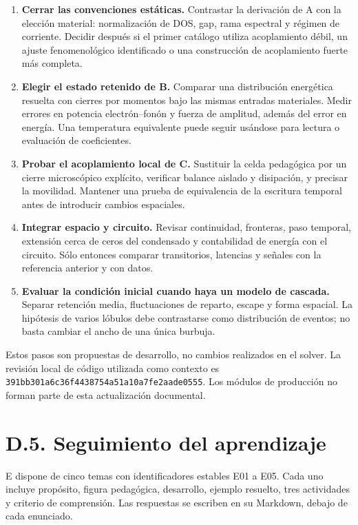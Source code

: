 \documentclass[
  spanish,
  10pt,
  a4paper,
]{article}
\providecommand{\tightlist}{%
  \setlength{\itemsep}{0pt}\setlength{\parskip}{0pt}}
\begin{document}
\begin{enumerate}
\def\labelenumi{\arabic{enumi}.}
\tightlist
\item
  \textbf{Cerrar las convenciones estáticas.} Contrastar la derivación
  de A con la elección material: normalización de DOS, gap, rama
  espectral y régimen de corriente. Decidir después si el primer
  catálogo utiliza acoplamiento débil, un ajuste fenomenológico
  identificado o una construcción de acoplamiento fuerte más completa.
\item
  \textbf{Elegir el estado retenido de B.} Comparar una distribución
  energética resuelta con cierres por momentos bajo las mismas entradas
  materiales. Medir errores en potencia electrón--fonón y fuerza de
  amplitud, además del error en energía. Una temperatura equivalente
  puede seguir usándose para lectura o evaluación de coeficientes.
\item
  \textbf{Probar el acoplamiento local de C.} Sustituir la celda
  pedagógica por un cierre microscópico explícito, verificar balance
  aislado y disipación, y precisar la movilidad. Mantener una prueba de
  equivalencia de la escritura temporal antes de introducir cambios
  espaciales.
\item
  \textbf{Integrar espacio y circuito.} Revisar continuidad, fronteras,
  paso temporal, extensión cerca de ceros del condensado y contabilidad
  de energía con el circuito. Sólo entonces comparar transitorios,
  latencias y señales con la referencia anterior y con datos.
\item
  \textbf{Evaluar la condición inicial cuando haya un modelo de
  cascada.} Separar retención media, fluctuaciones de reparto, escape y
  forma espacial. La hipótesis de varios lóbulos debe contrastarse como
  distribución de eventos; no basta cambiar el ancho de una única
  burbuja.
\end{enumerate}

Estos pasos son propuestas de desarrollo, no cambios realizados en el
solver. La revisión local de código utilizada como contexto es
\nolinkurl{391bb301a6c36f4438754a51a10a7fe2aade0555}. Los módulos de
producción no forman parte de esta actualización documental.

\section{D.5. Seguimiento del
aprendizaje}\label{d.5.-seguimiento-del-aprendizaje}

E dispone de cinco temas con identificadores estables E01 a E05. Cada
uno incluye propósito, figura pedagógica, desarrollo, ejemplo resuelto,
tres actividades y criterio de comprensión. Las respuestas se escriben
en su Markdown, debajo de cada enunciado.
\end{document}
